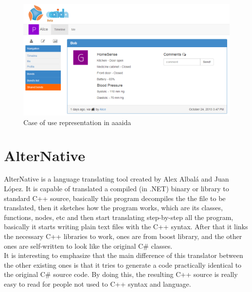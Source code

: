 \begin{figure}[H]\begin{center}
 \centering
  \captionsetup{justification=centering}
  \includegraphics[width=1\textwidth]{pictures/proposal/aaaida-use-case}
  \caption{Case of use representation in aaaida \label{fig:network-architecture}}
\end{center}\end{figure}

\section{AlterNative}\label{S:Proposal-AlterNative}
AlterNative is a language translating tool created by Alex Albal\'{a} and Juan L\'{o}pez. It is capable of translated a compiled (in .NET) binary or library to standard C++ source, basically this program decompiles the the file to be translated, then it sketches how the program works, which are its classes, functions, nodes, etc and then start translating step-by-step all the program, basically it starts writing plain text files with the C++ syntax. After that it links the necessary C++ libraries to work, ones are from boost library, and the other ones are self-written to look like the original C\# classes.
\\
It is interesting to emphasize that the main difference of this translator between the other existing ones is that it tries to generate a code practically identical to the original C\# source code. By doing this, the resulting C++ source is really easy to read for people not used to C++ syntax and language.

